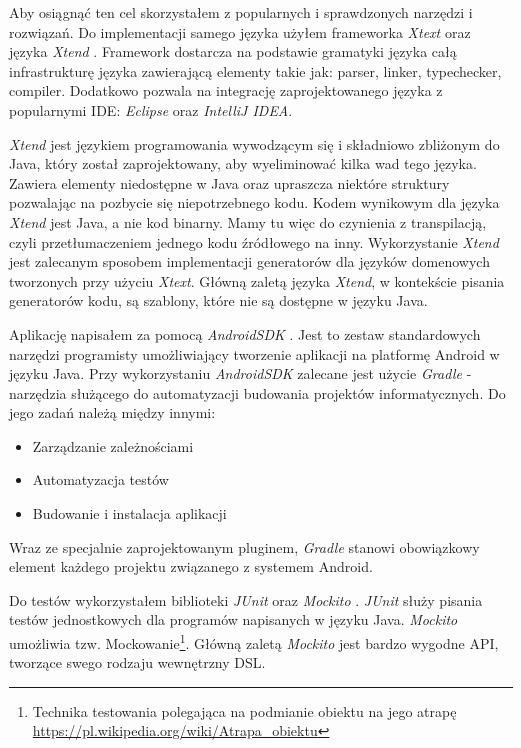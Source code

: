 \documentclass[openright]{xmgr}
\begin{document}
Aby osiągnąć ten cel skorzystałem z popularnych i sprawdzonych narzędzi i rozwiązań. Do implementacji samego języka użyłem frameworka \textit{Xtext} oraz języka \textit{Xtend} \cite{Xtend:2017:Doc}. Framework dostarcza na podstawie gramatyki języka całą infrastrukturę języka zawierającą elementy takie jak: parser, linker, typechecker, compiler. Dodatkowo pozwala na integrację zaprojektowanego języka z popularnymi IDE: \textit{Eclipse} oraz \textit{IntelliJ IDEA}. 

\textit{Xtend} jest językiem programowania wywodzącym się i składniowo zbliżonym do Java, który został zaprojektowany, aby wyeliminować kilka wad tego języka. Zawiera elementy niedostępne w Java oraz upraszcza niektóre struktury pozwalając na pozbycie się niepotrzebnego kodu. Kodem wynikowym dla języka \textit{Xtend} jest Java, a nie kod binarny. Mamy tu więc do czynienia z transpilacją, czyli przetłumaczeniem jednego kodu źródłowego na inny. Wykorzystanie \textit{Xtend} jest zalecanym sposobem implementacji generatorów dla języków domenowych tworzonych przy użyciu \textit{Xtext}. Główną zaletą języka \textit{Xtend}, w kontekście pisania generatorów kodu, są szablony, które nie są dostępne w języku Java.

Aplikację napisałem za pomocą \textit{AndroidSDK} \cite{AndroidSDK:2017:Doc}. Jest to zestaw standardowych narzędzi programisty umożliwiający tworzenie aplikacji na platformę Android w języku Java. Przy wykorzystaniu \textit{AndroidSDK} zalecane jest użycie \textit{Gradle} \cite{Gradle:2017:Doc} - narzędzia służącego do automatyzacji budowania projektów informatycznych. Do jego zadań należą między innymi:
\begin{itemize}
\item Zarządzanie zależnościami
\item Automatyzacja testów
\item Budowanie i instalacja aplikacji
\end{itemize}
Wraz ze specjalnie zaprojektowanym pluginem, \textit{Gradle} stanowi obowiązkowy element każdego projektu związanego z systemem Android.

Do testów wykorzystałem biblioteki \textit{JUnit} \cite{JUnit:2017:Doc} oraz \textit{Mockito} \cite{Mockito:2017:Doc}. \textit{JUnit} służy pisania testów jednostkowych dla programów napisanych w języku Java. \textit{Mockito} umożliwia tzw. Mockowanie\footnote{Technika testowania polegająca na podmianie obiektu na jego atrapę \url{https://pl.wikipedia.org/wiki/Atrapa_obiektu}}.  Główną zaletą \textit{Mockito} jest bardzo wygodne API, tworzące swego rodzaju wewnętrzny DSL.
\end{document}
